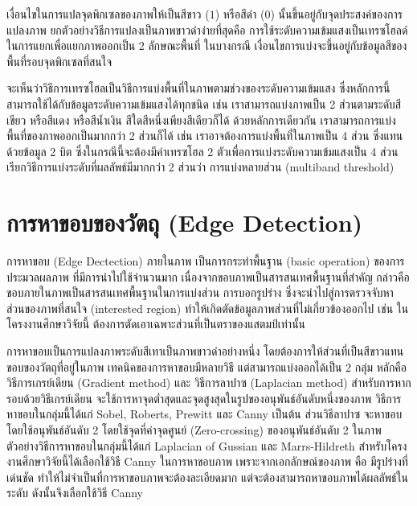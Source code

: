 เงื่อนไขในการแปลจุดพิกเซลของภาพให้เป็นสีขาว ($1$)  หรือสีดำ ($0$)  นั้นขึ้นอยู่กับจุดประสงค์ของการแปลงภาพ ยกตัวอย่างวิธีการแปลงเป็นภาพขาวดำง่ายที่สุดคือ การใช้ระดับความเข้มแสงเป็นเทรซโฮลด์ในการแยกเพื่อแยกภาพออกเป็น 2 ลักษณะพื้นที่  ในบางกรณี เงื่อนไขการแบ่งจะขึ้นอยู่กับข้อมูลสีของพื้นที่รอบจุดพิกเซลที่สนใจ


จะเห็นว่าวิธีการเทรซโฮลเป็นวิธีการแบ่งพื้นที่ในภาพตามช่วงของระดับความเข้มแสง ซึ่งหลักการนี้สามารถใช้ได้กับข้อมูลระดับความเข้มแสงได้ทุกชนิด เช่น เราสามารถแบ่งภาพเป็น 2  ส่วนตามระดับสีเขียว หรือสีแดง หรือสีน้ำเงิน สีใดสีหนึ่งเพียงสีเดียวก็ได้ ด้วยหลักการเดียวกัน เราสามารถการแบ่งพื้นที่ของภาพออกเป็นมากกว่า 2 ส่วนก็ได้ เช่น เราอาจต้องการแบ่งพื้นที่ในภาพเป็น 4 ส่วน ซึ่งแทนด้วยข้อมูล 2 บิต ซึ่งในกรณีนี้จะต้องมีค่าเทรซโฮล 2 ตัวเพื่อการแบ่งระดับความเข้มแสงเป็น 4 ส่วน เรียกวิธีการแบ่งระดับที่ผลลัพธ์มีมากกว่า 2 ส่วนว่า การแบ่งหลายส่วน (multiband threshold)


\section{การหาขอบของวัตถุ (Edge Detection)}
การหาขอบ (Edge Dectection) ภายในภาพ เป็นการกระทำพื้นฐาน (basic operation) ของการประมวลผลภาพ  ที่มีการนำไปใช้จำนวนมาก เนื่องจากขอบภาพเป็นสารสนเทศพื้นฐานที่สำคัญ กล่าวคือขอบภายในภาพเป็นสารสนเทศพื้นฐานในการแบ่งส่วน การบอกรูปร่าง ซึ่งจะนำไปสู่การตรวจจับหาส่วนของภาพที่สนใจ (interested region) ทำให้เกิดตัดข้อมูลภาพส่วนที่ไม่เกี่ยวข้องออกไป เช่น ในโครงงานศึกษาวิจัยนี้ ต้องการตัดเอาเฉพาะส่วนที่เป็นตราของแสตมป์เท่านั้น


การหาขอบเป็นการแปลงภาพระดับสีเทาเป็นภาพขาวดำอย่างหนึ่ง โดยต้องการให้ส่วนที่เป็นสีขาวแทนขอบของวัตถุที่อยู่ในภาพ เทคนิคของการหาขอบมีหลายวิธี  แต่สามารถแบ่งออกได้เป็น 2 กลุ่ม หลักคือ วิธีการเกรย์เดียน (Gradient method) และ วิธีการลาปาซ (Laplacian method) สำหรับการหากรอบด้วยวิธีเกรย์เดียน  จะใช้การหาจุดต่ำสุดและจุดสูงสุดในรูปของอนุพันธ์อันดับหนึ่งของภาพ  วิธีการหาขอบในกลุ่มนี้ได้แก่ Sobel, Roberts, Prewitt และ Canny เป็นต้น ส่วนวิธีลาปาซ  จะหาขอบโดยใช้อนุพันธ์อันดับ 2 โดยใช้จุดที่ค่าจุดศูนย์ (Zero-crossing) ของอนุพันธ์อันดับ 2 ในภาพ ตัวอย่างวิธีการหาขอบในกลุ่มนี้ได้แก่ Laplacian of Gussian และ Marrs-Hildreth สำหรับโครงงานศึกษาวิจัยนี้ได้เลือกใช้วิธี Canny ในการหาขอบภาพ เพราะจากเอกลักษณ์ของภาพ  คือ  มีรูปร่างที่เด่นชัด ทำให้ไม่จำเป็นที่การหาขอบภาพจะต้องละเอียดมาก  แต่จะต้องสามารถหาขอบภาพได้ผลลัพธ์ในระดับ  ดังนั้นจึงเลือกใช้วิธี Canny 

